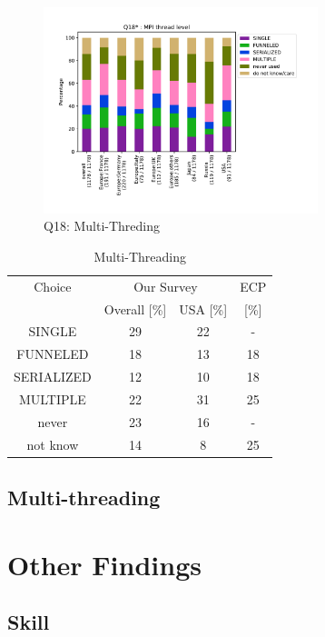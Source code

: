 \documentclass[conference,10pt,letterpaper]{IEEEtran}
\begin{document}
\begin{figure}[htb]
\begin{center}
\includegraphics[width=8cm]{Figs/Q18-enlarged.pdf}
\caption{Q18: Multi-Threding}
\label{fig:multi-thread}
\end{center}
\end{figure}

\begin{table}[htb]%
\begin{center}%
\caption{Multi-Threading}\label{tab:multi-thread}%
\begin{tabular}{c||c|c||c}%
\hline%
Choice & \multicolumn{2}{c||}{Our Survey} & ECP \\
\cline{2-4}%
& Overall [\%] & USA [\%] & [\%] \\
\hline%
\hline%
SINGLE & 29 & 22 & - \\
FUNNELED & 18 & 13 & 18 \\
SERIALIZED & 12 & 10 & 18 \\
MULTIPLE & 22 & 31 & 25 \\
never & 23 & 16 & - \\
not know & 14 & 8 & 25 \\
\hline%
\end{tabular}%
\end{center}%
\end{table}%


\subsection{Multi-threading}


\section{Other Findings}

\subsection{Skill}
\end{document}
